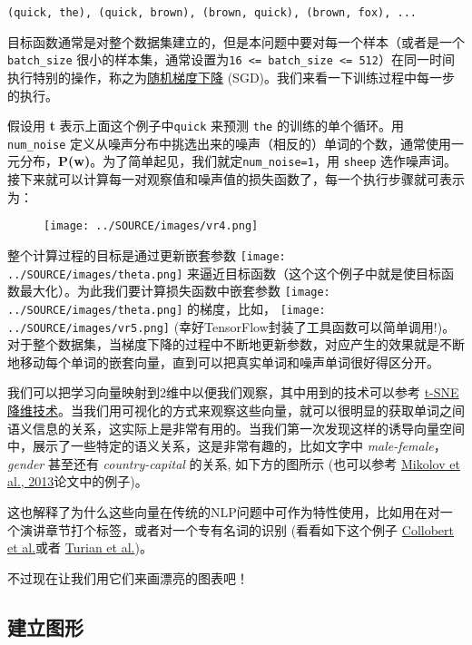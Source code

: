 \texttt{(quick,\ the),\ (quick,\ brown),\ (brown,\ quick),\ (brown,\ fox),\ ...}

目标函数通常是对整个数据集建立的，但是本问题中要对每一个样本（或者是一个\texttt{batch\_size}
很小的样本集，通常设置为\texttt{16\ \textless{}=\ batch\_size\ \textless{}=\ 512}）在同一时间执行特别的操作，称之为\href{https://en.wikipedia.org/wiki/Stochastic_gradient_descent}{随机梯度下降}
(SGD)。我们来看一下训练过程中每一步的执行。

假设用 \textbf{t} 表示上面这个例子中\texttt{quick} 来预测 \texttt{the}
的训练的单个循环。用 \texttt{num\_noise}
定义从噪声分布中挑选出来的噪声（相反的）单词的个数，通常使用一元分布，\textbf{P(w)}。为了简单起见，我们就定\texttt{num\_noise=1}，用
\texttt{sheep}
选作噪声词。接下来就可以计算每一对观察值和噪声值的损失函数了，每一个执行步骤就可表示为：

\begin{figure}[htbp]
\centering
\texttt{[image: ../SOURCE/images/vr4.png]}
\caption{}
\end{figure}

整个计算过程的目标是通过更新嵌套参数
\texttt{[image: ../SOURCE/images/theta.png]}
来逼近目标函数（这个这个例子中就是使目标函数最大化）。为此我们要计算损失函数中嵌套参数
\texttt{[image: ../SOURCE/images/theta.png]} 的梯度，比如，
\texttt{[image: ../SOURCE/images/vr5.png]}
(幸好TensorFlow封装了工具函数可以简单调用!)。对于整个数据集，当梯度下降的过程中不断地更新参数，对应产生的效果就是不断地移动每个单词的嵌套向量，直到可以把真实单词和噪声单词很好得区分开。

我们可以把学习向量映射到2维中以便我们观察，其中用到的技术可以参考
\href{http://lvdmaaten.github.io/tsne/}{t-SNE
降维技术}。当我们用可视化的方式来观察这些向量，就可以很明显的获取单词之间语义信息的关系，这实际上是非常有用的。当我们第一次发现这样的诱导向量空间中，展示了一些特定的语义关系，这是非常有趣的，比如文字中
\emph{male-female}，\emph{gender} 甚至还有 \emph{country-capital}
的关系, 如下方的图所示 (也可以参考
\href{http://www.aclweb.org/anthology/N13-1090}{Mikolov et al.,
2013}论文中的例子)。

这也解释了为什么这些向量在传统的NLP问题中可作为特性使用，比如用在对一个演讲章节打个标签，或者对一个专有名词的识别
(看看如下这个例子 \href{http://arxiv.org/pdf/1103.0398v1.pdf}{Collobert
et al.}或者 \href{http://www.aclweb.org/anthology/P10-1040}{Turian et
al.})。

不过现在让我们用它们来画漂亮的图表吧！

\subsection{建立图形 }\label{ux5efaux7acbux56feux5f62}

